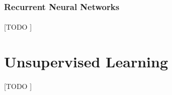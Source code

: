 \documentclass{article}
\begin{document}
			\subsubsection{Recurrent Neural Networks}
			\label{sec:rnn}

				\paragraph{}
				[TODO ]

	\section{Unsupervised Learning}
	\label{sec:unsupervised-learning}

			\paragraph{}
			[TODO ]


	\nocite{subject:taa}
	\nocite{pactk:py-machine-learning}

  
  
\end{document}
